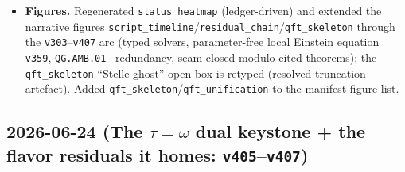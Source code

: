 \begin{itemize}
\item \textbf{Figures.} Regenerated \texttt{status\_heatmap} (ledger-driven) and extended the narrative figures \texttt{script\_timeline}/\texttt{residual\_chain}/\texttt{qft\_skeleton} through the \texttt{v303}--\texttt{v407} arc (typed solvers, parameter-free local Einstein equation \texttt{v359}, \texttt{QG.AMB.01} \mC\ redundancy, seam closed modulo cited theorems); the \texttt{qft\_skeleton} ``Stelle ghost'' open box is retyped (resolved truncation artefact). Added \texttt{qft\_skeleton}/\texttt{qft\_unification} to the manifest figure list.
\end{itemize}

\subsection*{2026-06-24 (The $\tau{=}\omega$ dual keystone + the flavor residuals it homes: \texttt{v405}--\texttt{v407})}

